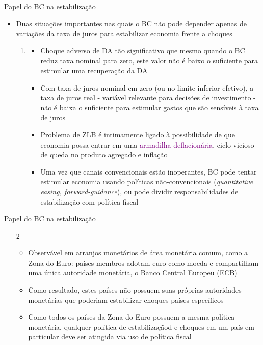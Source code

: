 \documentclass[10pt]{beamer}
\begin{document}
\begin{frame}
    {Papel do BC na estabilização}
    \begin{itemize}
        \item Duas situações importantes nas quais o BC não pode depender apenas de variações da taxa de juros para estabilizar economia frente a choques\bigskip
        \begin{enumerate}
            \item {}\medskip
            \begin{itemize}
                \item Choque adverso de DA tão significativo que mesmo quando o BC reduz taxa nominal para zero, este valor não é baixo o suficiente para estimular uma recuperação da DA\medskip
                \item Com taxa de juros nominal em zero (ou no limite inferior efetivo), a taxa de juros real - variável relevante para decisões de investimento - não é baixa o suficiente para estimular gastos que são sensíveis à taxa de juros\medskip
                \item Problema de ZLB é intimamente ligado à possibilidade de que economia possa entrar em uma \textcolor{purple}{armadilha deflacionária}, ciclo vicioso de queda no produto agregado e inflação\medskip
                \item Uma vez que canais convencionais estão inoperantes, BC pode tentar estimular economia usando políticas não-convencionais (\emph{quantitative easing, forward-guidance}), ou pode dividir responsabilidades de estabilização com política fiscal
            \end{itemize}
        \end{enumerate}
    \end{itemize}
\end{frame}

\begin{frame}
    {Papel do BC na estabilização}
    \begin{enumerate}
        \item[2] \medskip
        \begin{itemize}
            \item Observável em arranjos monetários de área monetária comum, como a Zona do Euro: países membros adotam euro como moeda e compartilham uma única autoridade monetária, o Banco Central Europeu (ECB)\medskip
            \item Como resultado, estes países não possuem suas próprias autoridades monetárias que poderiam estabilizar choques países-específicos\medskip
            \item Como todos os países da Zona do Euro possuem a mesma política monetária, qualquer política de estabilizaçãod e choques em um país em particular deve ser atingida via uso de política fiscal
        \end{itemize}
    \end{enumerate}
\end{frame}
\end{document}
